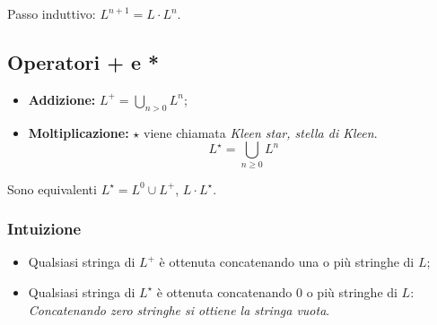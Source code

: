 Passo induttivo: $L^{n+1}=L\cdot L^n$.

\subsection{Operatori + e *}
\begin{itemize}
  \item \textbf{Addizione:} $L^+=\bigcup_{n>0}L^n$;
  \item \textbf{Moltiplicazione:} $\star$ viene chiamata \textit{Kleen star,
    stella di Kleen}.
    \[L^\star = \bigcup_{n\geq0}L^n\]
\end{itemize}
Sono equivalenti $L^\star=L^0\cup L^+$, $L\cdot L^\star$.

\subsubsection{Intuizione}
\begin{itemize}
  \item Qualsiasi stringa di $L^+$ è ottenuta concatenando una o più stringhe
    di $L$;
  \item Qualsiasi stringa di $L^\star$ è ottenuta concatenando $0$ o più
    stringhe di $L$: \emph{Concatenando zero stringhe si ottiene la stringa
    vuota}.
\end{itemize}
